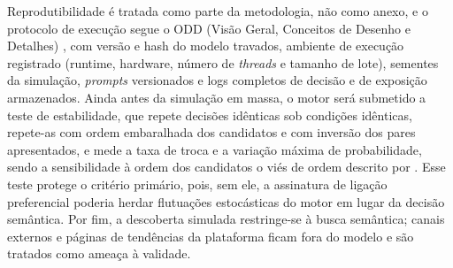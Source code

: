 \documentclass[12pt,oneside,a4paper,brazil,sumario=tradicional]{abntex2}
\begin{document}
Reprodutibilidade é tratada como parte da metodologia, não como anexo, e o protocolo de execução segue o ODD (Visão Geral, Conceitos de Desenho e Detalhes) \parencite{grimm2006}, com versão e hash do modelo travados, ambiente de execução registrado (runtime, hardware, número de \textit{threads} e tamanho de lote), sementes da simulação, \textit{prompts} versionados e logs completos de decisão e de exposição armazenados. Ainda antes da simulação em massa, o motor será submetido a teste de estabilidade, que repete decisões idênticas sob condições idênticas, repete-as com ordem embaralhada dos candidatos e com inversão dos pares apresentados, e mede a taxa de troca e a variação máxima de probabilidade, sendo a sensibilidade à ordem dos candidatos o viés de ordem descrito por \textcite{zhao2021}. Esse teste protege o critério primário, pois, sem ele, a assinatura de ligação preferencial poderia herdar flutuações estocásticas do motor em lugar da decisão semântica. Por fim, a descoberta simulada restringe-se à busca semântica; canais externos e páginas de tendências da plataforma ficam fora do modelo e são tratados como ameaça à validade.

\postextual
\printbibliography[heading=bibintoc,title={Referências Bibliográficas}]
\end{document}
